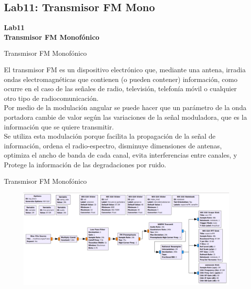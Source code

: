 \subsection{Lab11: Transmisor FM Mono}

\begin{frame}{}


\bfseries{\textrm{\LARGE Lab11\\ \Large Transmisor FM Monofónico}}
\raggedright
\end{frame}

\begin{frame}{Transmisor FM Monofónico}


El transmisor FM es un dispositivo electrónico que, mediante una antena, irradia ondas electromagnéticas que contienen (o pueden contener) información, como ocurre en el caso de las señales de radio, televisión, telefonía móvil o cualquier otro tipo de radiocomunicación.\\
\vspace{2mm}
Por medio de la modulación angular se puede hacer que un parámetro de la onda portadora cambie de valor según las variaciones de la señal moduladora, que es la información que se quiere transmitir. \\
\vspace{2mm}
Se utiliza esta modulación porque facilita la propagación de la señal de información, ordena el radio-espectro, disminuye dimensiones de antenas, optimiza el ancho de banda de cada canal, evita interferencias entre canales, y Protege la información de las degradaciones por ruido.


\end{frame}
\begin{frame}{Transmisor FM Monofónico}

\begin{figure}[H]
\centering
\vspace{-3mm}
\includegraphics[width=\textwidth]{parte3/lab11/pdf/lab11_1.pdf}
\end{figure}

\end{frame}

